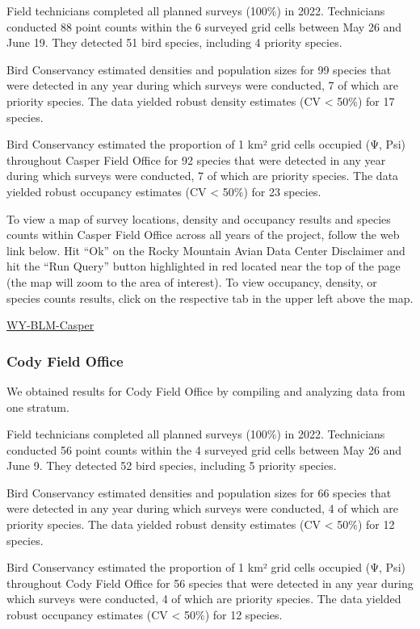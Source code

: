 \documentclass[
  letterpaper,
  DIV=11,
  numbers=noendperiod,
  oneside]{scrreprt}
\begin{document}
Field technicians completed all planned surveys (100\%) in 2022.
Technicians conducted 88 point counts within the 6 surveyed grid cells
between May 26 and June 19. They detected 51 bird species, including 4
priority species.

Bird Conservancy estimated densities and population sizes for 99 species
that were detected in any year during which surveys were conducted, 7 of
which are priority species. The data yielded robust density estimates
(CV \textless{} 50\%) for 17 species.

Bird Conservancy estimated the proportion of 1 km² grid cells occupied
(Ψ, Psi) throughout Casper Field Office for 92 species that were
detected in any year during which surveys were conducted, 7 of which are
priority species. The data yielded robust occupancy estimates (CV
\textless{} 50\%) for 23 species.

To view a map of survey locations, density and occupancy results and
species counts within Casper Field Office across all years of the
project, follow the web link below. Hit ``Ok'' on the Rocky Mountain
Avian Data Center Disclaimer and hit the ``Run Query'' button
highlighted in red located near the top of the page (the map will zoom
to the area of interest). To view occupancy, density, or species counts
results, click on the respective tab in the upper left above the map.

\href{http://www.rmbo.org/new_site/adc/QueryWindow.aspx\#N4IgzgrgDgpgTmALnAhoiBbEAuABCAdQE0BaAIQBkBZEgYRTFjhAF8g=}{WY-BLM-Casper}

\hypertarget{cody-field-office}{%
\subsubsection{Cody Field Office}\label{cody-field-office}}

We obtained results for Cody Field Office by compiling and analyzing
data from one stratum.

Field technicians completed all planned surveys (100\%) in 2022.
Technicians conducted 56 point counts within the 4 surveyed grid cells
between May 26 and June 9. They detected 52 bird species, including 5
priority species.

Bird Conservancy estimated densities and population sizes for 66 species
that were detected in any year during which surveys were conducted, 4 of
which are priority species. The data yielded robust density estimates
(CV \textless{} 50\%) for 12 species.

Bird Conservancy estimated the proportion of 1 km² grid cells occupied
(Ψ, Psi) throughout Cody Field Office for 56 species that were detected
in any year during which surveys were conducted, 4 of which are priority
species. The data yielded robust occupancy estimates (CV \textless{}
50\%) for 12 species.
\end{document}
